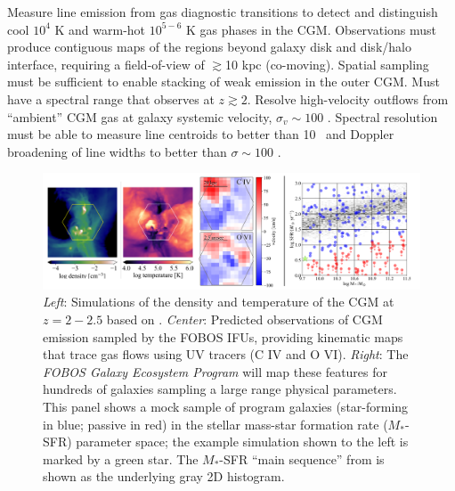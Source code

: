 \documentclass[11pt,a4paper,twoside,onecolumn,openany,final,oldfontcommands]{memoir}
\begin{document}

\begin{sciencerequirement}
\reqitem Measure line emission from gas diagnostic transitions to detect and distinguish cool $10^4$ K and warm-hot $10^{5-6}$ K gas phases in the CGM. 
\reqitem Observations must produce contiguous maps of the regions beyond galaxy disk and disk/halo interface, requiring a field-of-view of $\gtrsim$10 kpc (co-moving).
\reqitem Spatial sampling must be sufficient to enable stacking of weak emission in the outer CGM.
\reqitem Must have a spectral range that observes  at $z\gtrsim2$.
\reqitem Resolve high-velocity outflows from ``ambient'' CGM gas at galaxy systemic velocity, $\sigma_v \sim 100$ \kms.  
\reqitem Spectral resolution must be able to measure line centroids to better than 10 \kms\ and Doppler broadening of line widths to better than $\sigma \sim 100$ \kms. 
\end{sciencerequirement}




\begin{figure}
\includegraphics[width=\textwidth]{figs/msipProposalCgmCombo.pdf} 
\caption[CGM simulation examples and proposed sample]{\textit{Left}: Simulations of the density and temperature of the CGM at $z=2-2.5$ based on \citet{Corlies:2018aa}. \textit{Center}: Predicted observations of CGM emission sampled by the FOBOS IFUs, providing kinematic maps that trace gas flows using UV tracers (C IV and O VI).  \textit{Right}: The \textit{FOBOS Galaxy Ecosystem Program} will map these features for hundreds of galaxies sampling a large range physical parameters.  This panel shows a mock sample of program galaxies (star-forming in blue; passive in red) in the stellar mass-star formation rate ($M_*$-SFR) parameter space; the example simulation shown to the left is marked by a green star. The $M_*$-SFR ``main sequence'' from \citet{Whitaker:2012} is shown as the underlying gray 2D histogram.}
\label{fig:cgmsample}
\end{figure}
\end{document}
